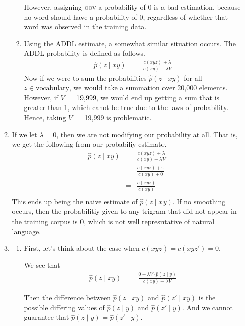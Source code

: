 \documentclass[11pt]{article}
\begin{document}
\begin{enumerate}
\begin{enumerate}[label=(\alph*)]
\begin{enumerate}[label=\roman*.]
			However, assigning \textsc{oov} a probability of 0 is a bad estimation, because no word should have a probability of 0, regardless of whether that word was observed in the training data.
		\item
			Using the ADDL estimate, a somewhat similar situation occurs. The ADDL probability is defined as follows.
			\begin{eqnarray*}
				\hat{p}(z \mid xy) &=& \frac{c(xyz) + \lambda}{c(xy) + \lambda V}
			\end{eqnarray*}
			Now if we were to sum the probabilities $\hat{p}(z \mid xy)$ for all $z \in \text{vocabulary}$, we would take a summation over 20,000 elements. However, if $V =$ 19,999, we would end up getting a sum that is greater than 1, which canot be true due to the laws of probability. Hence, taking $V =$ 19,999 is problematic.

		\end{enumerate}
	\item %
		If we let $\lambda = 0$, then we are not modifying our probability at all. That is, we get the following from our probabiliy estimate.
		\begin{eqnarray*}
			\hat{p}(z \mid xy) &=& \frac{c(xyz) + \lambda}{c(xy) + \lambda V} 	\\
							   &=& \frac{c(xyz) + 0}{c(xy) + 0} 				\\
							   &=& \frac{c(xyz)}{c(xy)} 						\\
		\end{eqnarray*}
		This ends up being the naive estimate of $\hat{p}(z \mid xy)$. If no smoothing occurs, then the probabilitiy given to any trigram that did not appear in the training corpus is 0, which is not well represntative of natural language.

	\newpage
	\item %

		\begin{enumerate}[label=\roman*.]
		\item
			First, let's think about the case when $c(xyz) = c(xyz') = 0$. \vspace{4pt}

			We see that
			\begin{eqnarray*}
				\hat{p}(z\mid xy) &=& \frac{0 + \lambda V \cdot \hat{p}(z \mid y)}{c(xy) + \lambda V}
			\end{eqnarray*}

			Then the difference between $\hat{p}(z\mid xy)$ and $\hat{p}(z' \mid xy)$ is the possible differing values of $\hat{p}(z \mid y)$ and $\hat{p}(z' \mid y)$. And we cannot guarantee that $\hat{p}(z \mid y)$ = $\hat{p}(z' \mid y)$. \vspace{4pt}


\end{enumerate}
\end{enumerate}
\end{enumerate}
\end{document}
